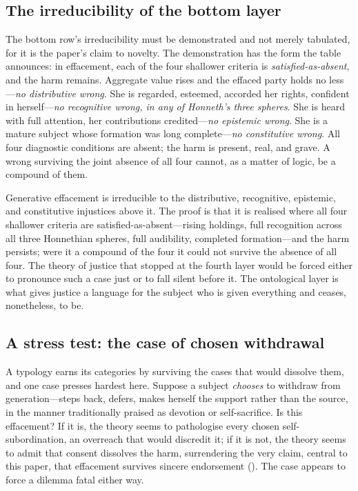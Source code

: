 \subsection{The irreducibility of the bottom layer}
\label{p18:sub:typ-irreducible}

The bottom row's irreducibility must be demonstrated and not merely tabulated, for it is the paper's claim to novelty. The demonstration has the form the table announces: in effacement, each of the four shallower criteria is \emph{satisfied-as-absent}, and the harm remains. Aggregate value rises and the effaced party holds no less---\emph{no distributive wrong}. She is regarded, esteemed, accorded her rights, confident in herself---\emph{no recognitive wrong, in any of Honneth's three spheres}. She is heard with full attention, her contributions credited---\emph{no epistemic wrong}. She is a mature subject whose formation was long complete---\emph{no constitutive wrong}. All four diagnostic conditions are absent; the harm is present, real, and grave. A wrong surviving the joint absence of all four cannot, as a matter of logic, be a compound of them.

\begin{claim}[Irreducibility]
Generative effacement is irreducible to the distributive, recognitive, epistemic, and constitutive injustices above it. The proof is that it is realised where all four shallower criteria are satisfied-as-absent---rising holdings, full recognition across all three Honnethian spheres, full audibility, completed formation---and the harm persists; were it a compound of the four it could not survive the absence of all four. The theory of justice that stopped at the fourth layer would be forced either to pronounce such a case just or to fall silent before it. The ontological layer is what gives justice a language for the subject who is given everything and ceases, nonetheless, to be.
\end{claim}

\subsection{A stress test: the case of chosen withdrawal}
\label{p18:sub:typ-stress}

A typology earns its categories by surviving the cases that would dissolve them, and one case presses hardest here. Suppose a subject \emph{chooses} to withdraw from generation---steps back, defers, makes herself the support rather than the source, in the manner traditionally praised as devotion or self-sacrifice. Is this effacement? If it is, the theory seems to pathologise every chosen self-subordination, an overreach that would discredit it; if it is not, the theory seems to admit that consent dissolves the harm, surrendering the very claim, central to this paper, that effacement survives sincere endorsement (). The case appears to force a dilemma fatal either way.

